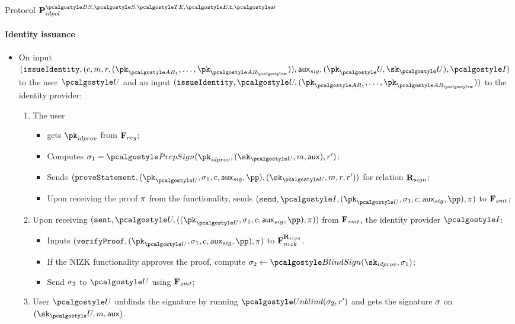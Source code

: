 \documentclass[runningheads,10pt]{llncs}
\numberwithin{equation}{section}
\begin{document}
\begin{protbox}{Protocol $\prot{idpol}^{\BSIG, \SIG, \TENC, \ENC, \thresholdar, \noofar}$}
  \paragraph{Identity issuance}
  \begin{itemize}
  \item On input $(\issueIdentity, (c, m, r, (\pk_{\ar_1}, \ldots,
    \pk_{\ar_\noofar})), \aux_{sig}, (\pk_\user, \sk_\user), \idprov)$ to the user
    $\user$ and an input $(\issueIdentity, \user, (\pk_{\ar_1}, \ldots,
    \pk_{\ar_\noofar}))$ to the identity provider:
    \begin{enumerate}
    \item The user
      \begin{itemize}
      \item gets $\pk_{idprov}$ from $\mathbf{F}_{{reg}}$;
      \item Computes $\signature_1 = \prepsign(\pk_{idprov}, (\sk_{\user}, m,
        \aux), r')$;
      \item Sends $(\proveStatement, (\pk_{\user}, \signature_1, c, \aux_{sig}, \pp),
        (\sk_{\user}, m, r, r'))$ for relation $\mathbf{R}_{sign}$; 
      \item Upon receiving the proof $\mathsf{\pi}$ from the functionality, sends
        $(\send, \idprov, (\pk_{\user}, \signature_1, c, \aux_{sig}, \pp),
        \zkproof)$ to $\mathbf{F}_{{smt}}$;
      \end{itemize}
    \item Upon receiving $(\sent, \user, ((\pk_{\user}, \signature_1, c, \aux_{sig},
      \pp), \zkproof))$ from $\mathbf{F}_{{smt}}$, the identity provider $\idprov$:
      \begin{itemize}
      \item Inputs $(\verifyProof, (\pk_{\user}, \signature_1, c, \aux_{sig}, \pp),
        \zkproof)$ to $\mathbf{F}_{{nizk}}^{\mathbf{R}_{sign}}$.
      \item If the NIZK functionality approves the proof, compute $\signature_2
        \gets \blindsign(\sk_{idprov}, \signature_1)$;
      \item Send $\sigma_2$ to $\user$ using $\mathbf{F}_{{smt}}$;
      \end{itemize}
    \item User $\user$ unblinds the signature by running
      $\unblind(\signature_2, r')$ and gets the signature $\sigma$ on
      $(\sk_\user, m, \aux)$.
    \end{enumerate}
  \end{itemize}


\end{protbox}
\end{document}
